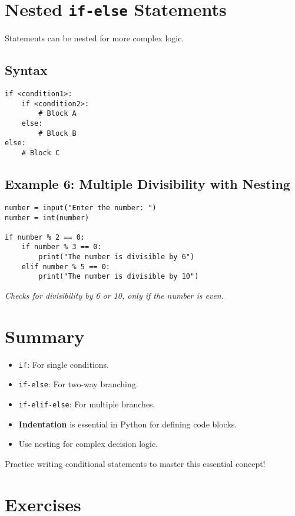 \section{Nested \texttt{if-else} Statements}

Statements can be nested for more complex logic.

\subsection*{Syntax}
\begin{verbatim}
if <condition1>:
    if <condition2>:
        # Block A
    else:
        # Block B
else:
    # Block C
\end{verbatim}

\subsection*{Example 6: Multiple Divisibility with Nesting}
\begin{verbatim}
number = input("Enter the number: ")
number = int(number)

if number % 2 == 0:
    if number % 3 == 0:
        print("The number is divisible by 6")
    elif number % 5 == 0:
        print("The number is divisible by 10")
\end{verbatim}
\textit{Checks for divisibility by 6 or 10, only if the number is even.}


\section{Summary}

\begin{itemize}
    \item \texttt{if}: For single conditions.
    \item \texttt{if-else}: For two-way branching.
    \item \texttt{if-elif-else}: For multiple branches.
    \item \textbf{Indentation} is essential in Python for defining code blocks.
    \item Use nesting for complex decision logic.
\end{itemize}

Practice writing conditional statements to master this essential concept!

\section*{Exercises}

